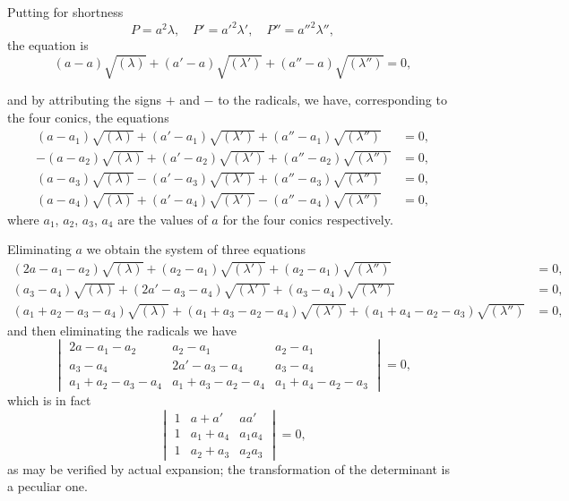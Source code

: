 \documentclass[11pt,a4paper]{article}
\theoremstyle{plain}
\begin{document}
Putting for shortness
\begin{equation}
P = a^2\lambda, \quad P' = a'^2\lambda', \quad P'' = a''^2\lambda'',
\end{equation}
the equation is
\begin{equation}
(a-a)\sqrt{(\lambda)} + (a'-a)\sqrt{(\lambda')} + (a''-a)\sqrt{(\lambda'')} = 0,
\end{equation}

\newpage
\setcounter{equation}{13}

and by attributing the signs $+$ and $-$ to the radicals, we have, corresponding to the four conics, the equations
\begin{align}
(a-a_1)\sqrt{(\lambda)} + (a'-a_1)\sqrt{(\lambda')} + (a''-a_1)\sqrt{(\lambda'')} &= 0, \\
-(a-a_2)\sqrt{(\lambda)} + (a'-a_2)\sqrt{(\lambda')} + (a''-a_2)\sqrt{(\lambda'')} &= 0, \\
(a-a_3)\sqrt{(\lambda)} - (a'-a_3)\sqrt{(\lambda')} + (a''-a_3)\sqrt{(\lambda'')} &= 0, \\
(a-a_4)\sqrt{(\lambda)} + (a'-a_4)\sqrt{(\lambda')} - (a''-a_4)\sqrt{(\lambda'')} &= 0,
\end{align}
where $a_1$, $a_2$, $a_3$, $a_4$ are the values of $a$ for the four conics respectively.

Eliminating $a$ we obtain the system of three equations
\begin{align}
(2a-a_1-a_2)\sqrt{(\lambda)} + (a_2-a_1)\sqrt{(\lambda')} + (a_2-a_1)\sqrt{(\lambda'')} &= 0, \\
(a_3-a_4)\sqrt{(\lambda)} + (2a'-a_3-a_4)\sqrt{(\lambda')} + (a_3-a_4)\sqrt{(\lambda'')} &= 0, \\
(a_1+a_2-a_3-a_4)\sqrt{(\lambda)} + (a_1+a_3-a_2-a_4)\sqrt{(\lambda')} + (a_1+a_4-a_2-a_3)\sqrt{(\lambda'')} &= 0,
\end{align}
and then eliminating the radicals we have
\begin{equation}
\begin{vmatrix}
2a-a_1-a_2 & a_2-a_1 & a_2-a_1 \\
a_3-a_4 & 2a'-a_3-a_4 & a_3-a_4 \\
a_1+a_2-a_3-a_4 & a_1+a_3-a_2-a_4 & a_1+a_4-a_2-a_3
\end{vmatrix} = 0,
\end{equation}
which is in fact
\begin{equation}
\begin{vmatrix}
1 & a+a' & aa' \\
1 & a_1+a_4 & a_1a_4 \\
1 & a_2+a_3 & a_2a_3
\end{vmatrix} = 0,
\end{equation}
as may be verified by actual expansion; the transformation of the determinant is a peculiar one.
\end{document}
